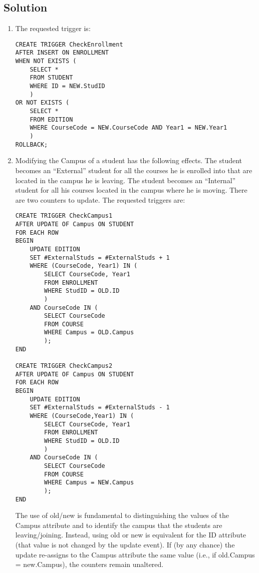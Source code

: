 \subsection*{Solution}
\begin{enumerate}
    \item The requested trigger is: 
        \begin{lstlisting}[style=SQL]
CREATE TRIGGER CheckEnrollment
AFTER INSERT ON ENROLLMENT
WHEN NOT EXISTS ( 
    SELECT *
    FROM STUDENT
    WHERE ID = NEW.StudID 
    )
OR NOT EXISTS ( 
    SELECT *
    FROM EDITION
    WHERE CourseCode = NEW.CourseCode AND Year1 = NEW.Year1 
    )
ROLLBACK;
        \end{lstlisting}
    \item Modifying the Campus of a student has the following effects. 
        The student becomes an “External” student for all the courses he is enrolled into that are located in the campus he is leaving. 
        The student becomes an “Internal” student for all his courses located in the campus where he is moving.
        There are two counters to update.
        The requested triggers are:
        \begin{lstlisting}[style=SQL]
CREATE TRIGGER CheckCampus1
AFTER UPDATE OF Campus ON STUDENT
FOR EACH ROW
BEGIN
    UPDATE EDITION
    SET #ExternalStuds = #ExternalStuds + 1
    WHERE (CourseCode, Year1) IN (
        SELECT CourseCode, Year1
        FROM ENROLLMENT
        WHERE StudID = OLD.ID 
        )
    AND CourseCode IN ( 
        SELECT CourseCode
        FROM COURSE
        WHERE Campus = OLD.Campus 
        );
END

CREATE TRIGGER CheckCampus2
AFTER UPDATE OF Campus ON STUDENT
FOR EACH ROW
BEGIN
    UPDATE EDITION
    SET #ExternalStuds = #ExternalStuds - 1
    WHERE (CourseCode,Year1) IN (
        SELECT CourseCode, Year1
        FROM ENROLLMENT
        WHERE StudID = OLD.ID
        )
    AND CourseCode IN ( 
        SELECT CourseCode
        FROM COURSE
        WHERE Campus = NEW.Campus
        );
END
        \end{lstlisting}
        The use of old/new is fundamental to distinguishing the values of the Campus attribute and to identify the campus that the students are leaving/joining. 
        Instead, using old or new is equivalent for the ID attribute (that value is not changed by the update event).
        If (by any chance) the update re-assigns to the Campus attribute the same value (i.e., if old.Campus = new.Campus), the counters remain unaltered.
\end{enumerate}